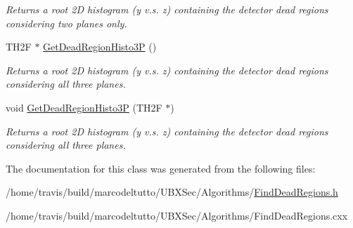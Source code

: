\begin{DoxyCompactItemize}
\begin{DoxyCompactList}\small\item\em Returns a root 2\-D histogram (y v.\-s. z) containing the detector dead regions considering two planes only. \end{DoxyCompactList}\item 
\hypertarget{classFindDeadRegions_abb378991861e7fdef4cd94a27d52ec07}{T\-H2\-F $\ast$ \hyperlink{classFindDeadRegions_abb378991861e7fdef4cd94a27d52ec07}{Get\-Dead\-Region\-Histo3\-P} ()}\label{classFindDeadRegions_abb378991861e7fdef4cd94a27d52ec07}

\begin{DoxyCompactList}\small\item\em Returns a root 2\-D histogram (y v.\-s. z) containing the detector dead regions considering all three planes. \end{DoxyCompactList}\item 
\hypertarget{classFindDeadRegions_a50de57c6d1792a6f2a93df8a44ba840a}{void \hyperlink{classFindDeadRegions_a50de57c6d1792a6f2a93df8a44ba840a}{Get\-Dead\-Region\-Histo3\-P} (T\-H2\-F $\ast$)}\label{classFindDeadRegions_a50de57c6d1792a6f2a93df8a44ba840a}

\begin{DoxyCompactList}\small\item\em Returns a root 2\-D histogram (y v.\-s. z) containing the detector dead regions considering all three planes. \end{DoxyCompactList}\end{DoxyCompactItemize}


The documentation for this class was generated from the following files\-:\begin{DoxyCompactItemize}
\item 
/home/travis/build/marcodeltutto/\-U\-B\-X\-Sec/\-Algorithms/\hyperlink{FindDeadRegions_8h}{Find\-Dead\-Regions.\-h}\item 
/home/travis/build/marcodeltutto/\-U\-B\-X\-Sec/\-Algorithms/Find\-Dead\-Regions.\-cxx\end{DoxyCompactItemize}
